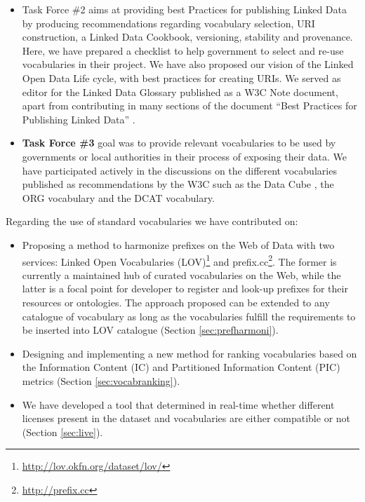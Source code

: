 \begin{enumerate}
\begin{itemize}
\item Task Force \#2 aims at providing best Practices for publishing Linked Data by producing recommendations regarding vocabulary selection, URI construction, a Linked Data Cookbook, versioning, stability and provenance. Here, we have prepared a checklist to help government to select and re-use vocabularies in their project. We have also proposed our vision of the Linked Open Data Life cycle, with best practices for creating URIs. We served as editor for the Linked Data Glossary \cite{glossairegld} published as a W3C Note document, apart from contributing in many sections of the document ``Best Practices for Publishing Linked Data'' \cite{bpgld}.

\item \textbf{Task Force \#3} goal was to provide relevant vocabularies to be used by governments or local authorities in their process of exposing their data. We have participated actively in the discussions on the different vocabularies published as recommendations by the W3C such as the Data Cube \cite{dcube}, the ORG vocabulary \cite{org} and the DCAT \cite{dcat} vocabulary.
\end{itemize}

Regarding the use of standard vocabularies we have contributed on: 
\begin{itemize}

\item  Proposing a method to harmonize prefixes on the Web of Data  with two services: Linked Open Vocabularies (LOV)\footnote{\url{http://lov.okfn.org/dataset/lov/}} and prefix.cc\footnote{\url{http://prefix.cc}}. The former is currently a maintained hub of curated vocabularies on the Web, while the latter is a focal point for developer to register and look-up prefixes for their resources or ontologies. The approach proposed can be extended to any catalogue of vocabulary as long as the vocabularies fulfill the requirements to be inserted into LOV catalogue (Section \ref{sec:prefharmoni}). 

\item  Designing and implementing a new method for ranking vocabularies based on the Information Content (IC) and Partitioned Information Content (PIC) metrics (Section \ref{sec:vocabranking}).

\item We have developed a tool that determined in real-time whether different licenses present in the dataset and vocabularies are either compatible or not (Section \ref{sec:live}). 
\end{itemize}


\end{enumerate}
